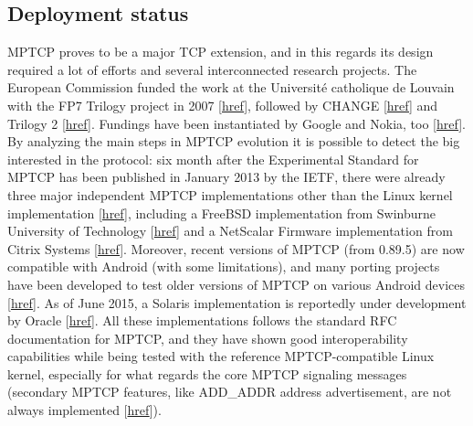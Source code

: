 \subsection{Deployment status}
MPTCP proves to be a major TCP extension, and in this regards its design required a lot of efforts and several interconnected research projects. The European Commission funded the work at the Université catholique de Louvain with the FP7 Trilogy project in 2007 [\href{http://www.trilogy-project.org/}{href}], followed by CHANGE [\href{http://www.change-project.eu/}{href}] and Trilogy 2 [\href{http://trilogy2.it.uc3m.es/}{href}]. Fundings have been instantiated by Google and Nokia, too [\href{https://multipath-tcp.org/pmwiki.php}{href}]. 
By analyzing the main steps in MPTCP evolution it is possible to detect the big interested in the protocol: six month after the Experimental Standard for MPTCP has been published in January 2013 by the IETF, there were already three major independent MPTCP implementations other than the Linux kernel implementation [\href{https://datatracker.ietf.org/doc/draft-eardley-mptcp-implementations-survey/?include_text=1}{href}], including a FreeBSD implementation from Swinburne University of Technology [\href{http://lists.freebsd.org/pipermail/freebsd-net/2013-March/034882.html}{href}] and a NetScalar Firmware implementation from Citrix Systems [\href{https://www.citrix.com/blogs/2013/05/28/maximize-mobile-user-experience-with-netscaler-multipath-tcp/}{href}].
Moreover, recent versions of MPTCP (from 0.89.5) are now compatible with Android (with some limitations), and many porting projects have been developed to test older versions of MPTCP on various Android devices [\href{https://multipath-tcp.org/pmwiki.php?n=Users.Android}{href}].
As of June 2015, a Solaris implementation is reportedly under development by Oracle [\href{https://mailarchive.ietf.org/arch/msg/multipathtcp/ugMIu566McQMn8YCju-CTjW9beY}{href}].
All these implementations follows the standard RFC documentation for MPTCP, and they have shown good interoperability capabilities while being tested with the reference MPTCP-compatible Linux kernel, especially for what regards the core MPTCP signaling messages (secondary MPTCP features, like ADD\_ADDR address advertisement, are not always implemented [\href{https://datatracker.ietf.org/doc/draft-eardley-mptcp-implementations-survey/?include_text=1}{href}]).


